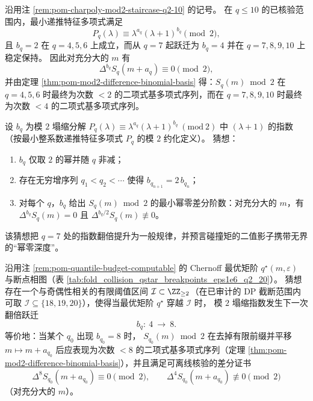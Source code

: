 \begin{corollary}[碰撞矩序列的模 \(2\) 阶跃：\(q=7\) 处差分阶数从 \(2\) 跃迁到 \(4\)]\label{cor:pom-mod2-staircase-q7-difference-order-jump}
沿用注 \ref{rem:pom-charpoly-mod2-staircase-q2-10} 的记号。
在 \(q\le 10\) 的已核验范围内，最小递推特征多项式满足
\[
P_q(\lambda)\equiv \lambda^{a_q}(\lambda+1)^{b_q}\pmod 2,
\]
且 \(b_q=2\) 在 \(q=4,5,6\) 上成立，而从 \(q=7\) 起跃迁为 \(b_q=4\) 并在 \(q=7,8,9,10\) 上稳定保持。
因此对充分大的 \(m\) 有
\[
\Delta^{b_q}S_q(m+a_q)\equiv 0\pmod 2,
\]
并由定理 \ref{thm:pom-mod2-difference-binomial-basis} 得：\(S_q(m)\bmod 2\) 在 \(q=4,5,6\) 时最终为次数 \(<2\) 的二项式基多项式序列，而在 \(q=7,8,9,10\) 时最终为次数 \(<4\) 的二项式基多项式序列。
\end{corollary}

\begin{conjecture}\label{conj:pom-mod2-collapse-exponent-tower}
设 \(b_q\) 为模 \(2\) 塌缩分解
\(
P_q(\lambda)\equiv \lambda^{a_q}(\lambda+1)^{b_q}\ (\mathrm{mod}\ 2)
\)
中 \((\lambda+1)\) 的指数（按最小整系数递推特征多项式 \(P_q\) 的模 \(2\) 约化定义）。
猜想：
\begin{enumerate}
\normalfont
  \item \(b_q\) 仅取 \(2\) 的幂并随 \(q\) 非减；
  \item 存在无穷增序列 \(q_1<q_2<\cdots\) 使得 \(b_{q_{n+1}}=2\,b_{q_n}\)；
  \item 对每个 \(q\)，\(b_q\) 给出 \(S_q(m)\bmod 2\) 的最小幂零差分阶数：对充分大的 \(m\)，有 \(\Delta^{b_q}S_q(m)=0\) 且 \(\Delta^{b_q/2}S_q(m)\not\equiv 0\)。
\end{enumerate}
该猜想把 \(q=7\) 处的指数翻倍提升为一般规律，并预言碰撞矩的二值影子携带无界的“幂零深度”。
\end{conjecture}

\begin{conjecture}\label{conj:pom-mod2-bq-next-jump-locks-to-qstar}
沿用注 \ref{rem:pom-quantile-budget-computable} 的 Chernoff 最优矩阶 \(q^\star(m,\varepsilon)\) 与断点相图（表 \ref{tab:fold_collision_qstar_breakpoints_eps1e6_q2_20}）。
猜想存在一个与奇偶性相关的有限阈值区间 \(\mathcal{I}\subset\ZZ_{\ge 2}\)（在已审计的 DP 截断范围内可取 \(\mathcal{I}\subseteq\{18,19,20\}\)），使得当最优矩阶 \(q^\star\) 穿越 \(\mathcal{I}\) 时，
模 \(2\) 塌缩指数发生下一次翻倍跃迁
\[
b_q:\ 4\ \longrightarrow\ 8.
\]
等价地：当某个 \(q_0\) 出现 \(b_{q_0}=8\) 时，
\(S_{q_0}(m)\bmod 2\) 在去掉有限前缀并平移 \(m\mapsto m+a_{q_0}\) 后应表现为次数 \(<8\) 的二项式基多项式序列（定理 \ref{thm:pom-mod2-difference-binomial-basis}），并且满足可离线核验的差分证书
\[
\Delta^{8}S_{q_0}(m+a_{q_0})\equiv 0\pmod 2,
\qquad
\Delta^{4}S_{q_0}(m+a_{q_0})\not\equiv 0\pmod 2
\]
（对充分大的 \(m\)）。
\end{conjecture}

\endinput
